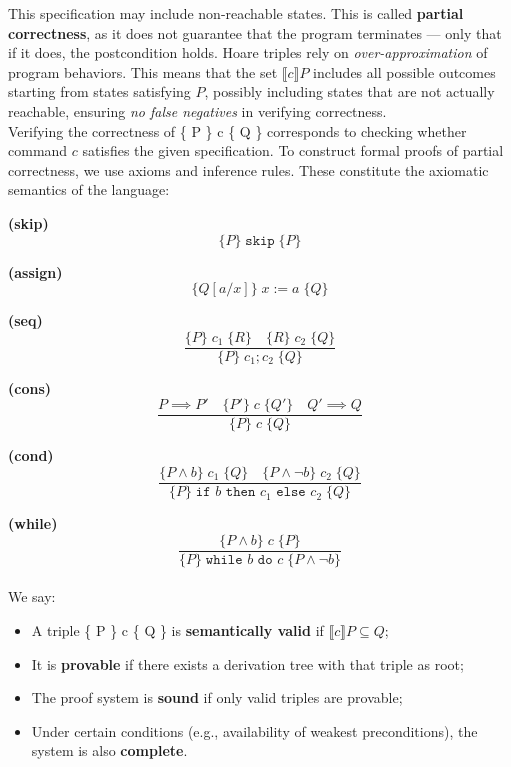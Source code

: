 \documentclass[parskip=half]{scrartcl}
\begin{document}
This specification may include non-reachable states. This is called \textbf{partial correctness}, as it does not guarantee that the program terminates — only that if it does, the postcondition holds.
Hoare triples rely on \emph{over-approximation} of program behaviors. This means that the set $\llbracket c \rrbracket P$ includes all possible outcomes starting from states satisfying $P$, possibly including states that are not actually reachable, ensuring \emph{no false negatives} in verifying correctness.
\\ Verifying the correctness of \{ P \} c \{ Q \} corresponds to checking whether command $c$ satisfies the given specification. To construct formal proofs of partial correctness, we use axioms and inference rules. These constitute the axiomatic semantics of the language:

\textbf{(skip)} 
\[
\{P\} \;\texttt{skip}\; \{P\}
\]

\textbf{(assign)} 
\[
\{Q[a/x]\} \; x := a \; \{Q\}
\]

\textbf{(seq)} 
\[
\frac{\{P\} \; c_1 \; \{R\} \quad \{R\} \; c_2 \; \{Q\}}{\{P\} \; c_1; c_2 \; \{Q\}}
\]

\textbf{(cons)} 
\[
\frac{P \implies P' \quad \{P'\} \; c \; \{Q'\} \quad Q' \implies Q}{\{P\} \; c \; \{Q\}}
\]

\textbf{(cond)} 
\[
\frac{\{P \wedge b\} \; c_1 \; \{Q\} \quad \{P \wedge \neg b\} \; c_2 \; \{Q\}}{\{P\} \; \texttt{if } b \texttt{ then } c_1 \texttt{ else } c_2 \; \{Q\}}
\]

\textbf{(while)} 
\[
\frac{\{P \wedge b\} \; c \; \{P\}}{\{P\} \; \texttt{while } b \texttt{ do } c \; \{P \wedge \neg b\}}
\]
\\ We say:
\begin{itemize}
\item A triple \{ P \} c \{ Q \} is \textbf{semantically valid} if $\llbracket c \rrbracket P \subseteq Q$;
\item It is \textbf{provable} if there exists a derivation tree with that triple as root;
\item The proof system is \textbf{sound} if only valid triples are provable;
\item Under certain conditions (e.g., availability of weakest preconditions), the system is also \textbf{complete}.
\end{itemize}
\end{document}
